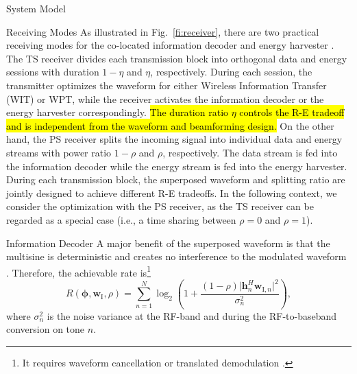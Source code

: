 \documentclass[journal,12pt,onecolumn,draftclsnofoot]{IEEEtran}
\begin{document}
\begin{section}{System Model}
\begin{subsection}{Receiving Modes}
			As illustrated in Fig.~\ref{fi:receiver}, there are two practical receiving modes for the co-located information decoder and energy harvester \cite{Zhou2013}. The TS receiver divides each transmission block into orthogonal data and energy sessions with duration $1-\eta$ and $\eta$, respectively. During each session, the transmitter optimizes the waveform for either Wireless Information Transfer (WIT) or WPT, while the receiver activates the information decoder or the energy harvester correspondingly. \hl{The duration ratio $\eta$ controls the R-E tradeoff and is independent from the waveform and beamforming design.} On the other hand, the PS receiver splits the incoming signal into individual data and energy streams with power ratio $1-\rho$ and $\rho$, respectively. The data stream is fed into the information decoder while the energy stream is fed into the energy harvester. During each transmission block, the superposed waveform and splitting ratio are jointly designed to achieve different R-E tradeoffs. In the following context, we consider the optimization with the PS receiver, as the TS receiver can be regarded as a special case (i.e., a time sharing between $\rho=0$ and $\rho=1$).
		\end{subsection}


		\begin{subsection}{Information Decoder}
			A major benefit of the superposed waveform is that the multisine is deterministic and creates no interference to the modulated waveform \cite{Clerckx2018b}. Therefore, the achievable rate is\footnote{It requires waveform cancellation or translated demodulation \cite{Clerckx2018b}.}
			\begin{equation}\label{eq:R}
				R(\boldsymbol{\phi},\boldsymbol{w}_{\mathrm{I}},\rho) = \sum_{n=1}^N{\log_2\left(1+\frac{(1-\rho)\lvert \boldsymbol{h}_{n}^H\boldsymbol{w}_{\mathrm{I},n} \rvert^2}{\sigma_n^2}\right)},
			\end{equation}
			where $\sigma_n^2$ is the noise variance at the RF-band and during the RF-to-baseband conversion on tone $n$.
		\end{subsection}



\end{section}
\end{document}
